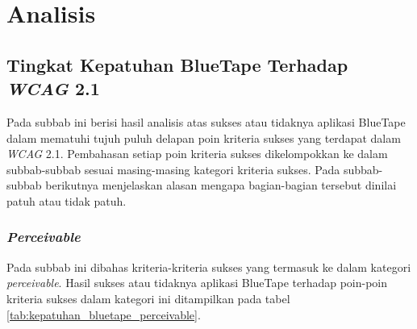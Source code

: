 \chapter{Analisis}
\label{chap:analisis}

\section{Tingkat Kepatuhan BlueTape Terhadap \textit{WCAG} 2.1}
\label{sec:kepatuhan_bluetape_terhadap_wcag_2.1}
Pada subbab ini berisi hasil analisis atas sukses atau tidaknya aplikasi BlueTape dalam mematuhi tujuh puluh delapan poin kriteria sukses yang terdapat dalam \textit{WCAG} 2.1. Pembahasan setiap poin kriteria sukses dikelompokkan ke dalam subbab-subbab sesuai masing-masing kategori kriteria sukses. Pada subbab-subbab berikutnya menjelaskan alasan mengapa bagian-bagian tersebut dinilai patuh atau tidak patuh.

\subsection{\textit{Perceivable}}
\label{subsec:kepatuhan_bluetape_perceivable}
Pada subbab ini dibahas kriteria-kriteria sukses yang termasuk ke dalam kategori \textit{perceivable}. Hasil sukses atau tidaknya aplikasi BlueTape terhadap poin-poin kriteria sukses dalam kategori ini ditampilkan pada tabel \ref{tab:kepatuhan_bluetape_perceivable}.

